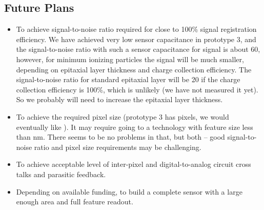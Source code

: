 \subsection{Future Plans}
\begin{itemize}
    \item To achieve signal-to-noise ratio required for close to 100\% signal registration efficiency. We have achieved very low sensor capacitance in prototype 3, and the signal-to-noise ratio with such a sensor capacitance for  signal is about 60, however, for minimum ionizing particles the signal will be much smaller, depending on epitaxial layer thickness and charge collection efficiency. The signal-to-noise ratio for standard \unit[7]{\micron} epitaxial layer will be 20 if the charge collection efficiency is 100\%, which is unlikely (we have not measured it yet). So we probably will need to increase the epitaxial layer thickness.
    \item To achieve the required pixel size (prototype 3 has \unit[25]{\micron} pixels, we would eventually like \unit[15]{\micron}). It may require going to a technology with feature size less than \unit[65]{nm}. There seems to be no problems in that, but both -- good signal-to-noise ratio and pixel size requirements may be challenging.
    \item To achieve acceptable level of inter-pixel and digital-to-analog circuit cross talks and parasitic feedback.
    \item Depending on available funding, to build a complete sensor with a large enough area and full feature readout.
\end{itemize}
